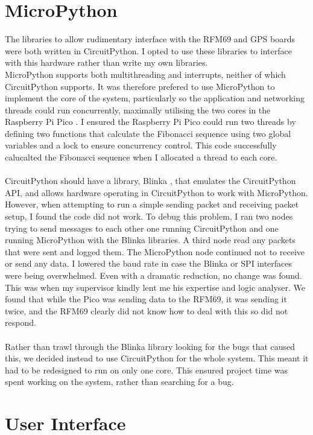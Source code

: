 \documentclass[12pt,a4paper]{report}
\begin{document}
 
\section{MicroPython}
The libraries to allow rudimentary interface with the RFM69 and GPS boards were both written in CircuitPython. I opted to use these libraries to interface with this hardware rather than write my own libraries. \\ 
MicroPython supports both multithreading and interrupts, neither of which CircuitPython supports. It was therefore prefered to use MicroPython to implement the core of the system, particularly so the application and networking threads could run concurrently, maximally utilising the two cores in the Raspberry Pi Pico \cite{rp2040}. I ensured the Raspberry Pi Pico could run two threads by defining two functions that calculate the Fibonacci sequence using two global variables and a lock to ensure concurrency control. This code successfully calucalted the Fibonacci sequence when I allocated a thread to each core. \\ \\ 
CircuitPython should have a library, Blinka \cite{blinka}, that emulates the CircuitPython API, and allows hardware operating in CircuitPython to work with MicroPython. However, when attempting to run a simple sending packet and receiving packet setup, I found the code did not work. To debug this problem, I ran two nodes trying to send messages to each other one running CircuitPython and one running MicroPython with the Blinka libraries. A third node read any packets that were sent and logged them. The MicroPython node continued not to receive or send any data. I lowered the baud rate in case the Blinka or SPI interfaces were being overwhelmed. Even with a dramatic reduction, no change was found. \\
This was when my supervisor kindly lent me his expertise and logic analyser. We found that while the Pico was sending data to the RFM69, it was sending it twice, and the RFM69 clearly did not know how to deal with this so did not respond. \\ \\
Rather than trawl through the Blinka library looking for the bugs that caused this, we decided instead to use CircuitPython for the whole system. This meant it had to be redesigned to run on only one core. This ensured project time was spent working on the system, rather than searching for a bug. 


\section{User Interface}
\end{document}
